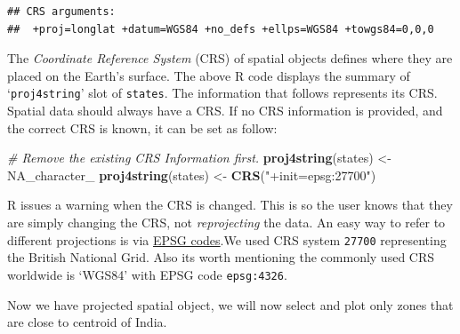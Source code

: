 \documentclass[]{article}
\newenvironment{Shaded}{}{}
\newcommand{\CommentTok}[1]{\textcolor[rgb]{0.38,0.63,0.69}{\textit{#1}}}
\newcommand{\KeywordTok}[1]{\textcolor[rgb]{0.00,0.44,0.13}{\textbf{#1}}}
\newcommand{\NormalTok}[1]{#1}
\newcommand{\OtherTok}[1]{\textcolor[rgb]{0.00,0.44,0.13}{#1}}
\newcommand{\StringTok}[1]{\textcolor[rgb]{0.25,0.44,0.63}{#1}}
\begin{document}
\begin{verbatim}
## CRS arguments:
##  +proj=longlat +datum=WGS84 +no_defs +ellps=WGS84 +towgs84=0,0,0
\end{verbatim}

The \emph{Coordinate Reference System} (CRS) of spatial objects defines
where they are placed on the Earth's surface. The above R code displays
the summary of `\texttt{proj4string}' slot of \texttt{states}. The
information that follows represents its CRS. Spatial data should always
have a CRS. If no CRS information is provided, and the correct CRS is
known, it can be set as follow:

\begin{Shaded}
\begin{Highlighting}[]
\CommentTok{# Remove the existing CRS Information first.}
\KeywordTok{proj4string}\NormalTok{(states) <-}\StringTok{ }\OtherTok{NA_character_}
\KeywordTok{proj4string}\NormalTok{(states) <-}\StringTok{ }\KeywordTok{CRS}\NormalTok{(}\StringTok{"+init=epsg:27700"}\NormalTok{)}
\end{Highlighting}
\end{Shaded}

R issues a warning when the CRS is changed. This is so the user knows
that they are simply changing the CRS, not \emph{reprojecting} the data.
An easy way to refer to different projections is via
\href{http://www.epsg-registry.org/}{EPSG codes}.We used CRS system
\texttt{27700} representing the British National Grid. Also its worth
mentioning the commonly used CRS worldwide is `WGS84' with EPSG code
\texttt{epsg:4326}.

Now we have projected spatial object, we will now select and plot only
zones that are close to centroid of India.
\end{document}
